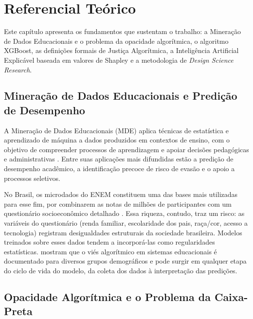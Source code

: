 \chapter{Referencial Teórico}
\label{cap:referencial}

Este capítulo apresenta os fundamentos que sustentam o trabalho: a Mineração de Dados Educacionais e o problema da opacidade algorítmica, o algoritmo XGBoost, as definições formais de Justiça Algorítmica, a Inteligência Artificial Explicável baseada em valores de Shapley e a metodologia de \textit{Design Science Research}.

\section{Mineração de Dados Educacionais e Predição de Desempenho}
\label{sec:rt_mde}

A Mineração de Dados Educacionais (MDE) aplica técnicas de estatística e aprendizado de máquina a dados produzidos em contextos de ensino, com o objetivo de compreender processos de aprendizagem e apoiar decisões pedagógicas e administrativas \cite{romero2010educational}. Entre suas aplicações mais difundidas estão a predição de desempenho acadêmico, a identificação precoce de risco de evasão e o apoio a processos seletivos.

No Brasil, os microdados do ENEM constituem uma das bases mais utilizadas para esse fim, por combinarem as notas de milhões de participantes com um questionário socioeconômico detalhado \cite{inep2022microdados}. Essa riqueza, contudo, traz um risco: as variáveis do questionário (renda familiar, escolaridade dos pais, raça/cor, acesso a tecnologia) registram desigualdades estruturais da sociedade brasileira. Modelos treinados sobre esses dados tendem a incorporá-las como regularidades estatísticas.  mostram que o viés algorítmico em sistemas educacionais é documentado para diversos grupos demográficos e pode surgir em qualquer etapa do ciclo de vida do modelo, da coleta dos dados à interpretação das predições.

\section{Opacidade Algorítmica e o Problema da Caixa-Preta}
\label{sec:rt_caixa_preta}


